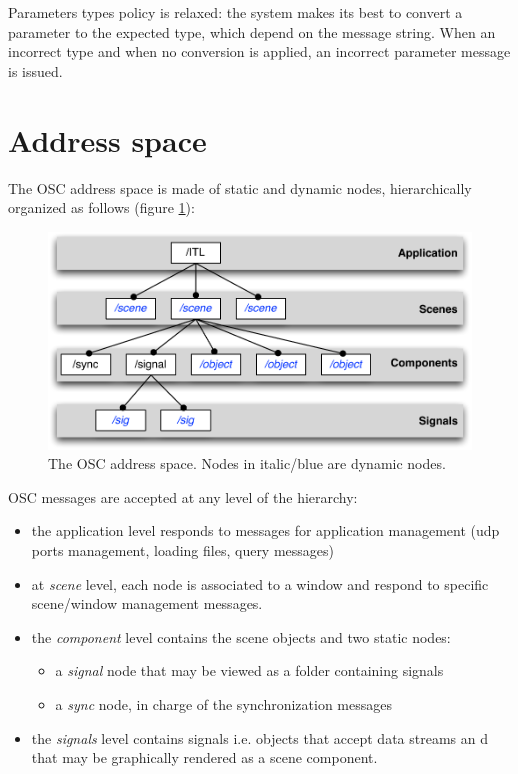 \documentclass[a4paper,twoside]{report}
\newcommand{\sublevel}[1]	{\section{#1}}
\begin{document}
Parameters types policy is relaxed: the system makes its best to convert a parameter to the expected type, which depend on the message string. When an incorrect type and when no conversion is applied, an incorrect parameter message is issued.

\sublevel{Address space}
The OSC address space is made of static and dynamic nodes, hierarchically organized as follows (figure \ref{fig:addrspace}):

\begin{figure}[h]
	\centering \includegraphics[width=120mm]{imgs/address_space}
 \caption{The OSC address space. Nodes in italic/blue are dynamic nodes.}
 \label{fig:addrspace}
\end{figure}

OSC messages are accepted at any level of the hierarchy:
\begin{itemize}
\item the application level responds to messages for application management (udp ports management, loading files, query messages)
\item at \emph{scene} level, each node is associated to a window and respond to specific scene/window management messages.
\item the \emph{component} level contains the scene objects and two static nodes:

\begin{itemize}
\item a \emph{signal} node that may be viewed as a folder containing signals
\item a \emph{sync} node, in charge of the synchronization messages
\end{itemize}

\item the \emph{signals} level contains signals i.e. objects that accept data streams an d that may be graphically rendered as a scene component.

\end{itemize}
\end{document}
